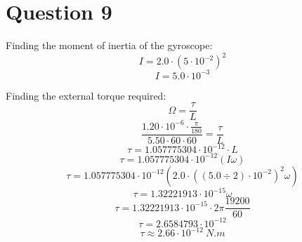 \documentclass[11pt]{article}
\begin{document}
\section{Question 9}
\label{sec:org195d9a5}
Finding the moment of inertia of the gyroscope:
\[I = 2.0 \cdot (5 \cdot 10^{-2})^2\]
\[I = 5.0 \cdot 10^{-3}\]

Finding the external torque required:
\[\Omega = \frac{\tau}{L}\]
\[\frac{1.20 \cdot 10^{-6} \cdot \frac{\pi}{180}}{5.50 \cdot 60 \cdot 60} = \frac{\tau}{L}\]
\[\tau = 1.057775304 \cdot 10^{-12} \cdot L\]
\[\tau = 1.057775304 \cdot 10^{-12} (I \omega)\]
\[\tau = 1.057775304 \cdot 10^{-12} (2.0 \cdot ((5.0 \div 2) \cdot 10^{-2})^2 \omega)\]
\[\tau = 1.32221913 \cdot 10^{-15} \omega\]
\[\tau = 1.32221913 \cdot 10^{-15} \cdot 2 \pi \frac{19200}{60}\]
\[\tau = 2.6584793 \cdot 10^{-12}\]
\[\tau \approx 2.66 \cdot 10^{-12} \ \unit{N.m}\]
\end{document}
